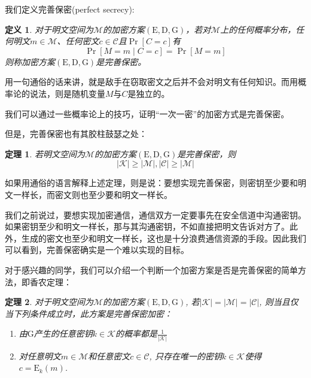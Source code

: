 \documentclass[UTF8]{ctexrep}
\newcommand{\ext}{\displaystyle}
\def\abs#1{\left| #1 \right|}
\def\pth#1{\left( {#1}\right)}
\def\brack#1{\left[ {#1}\right]}
\def\E#1#2{{\mathrm{E}_{#1}\left({#2}\right)}}
\newtheorem{Definition}{\hspace{2em}定义}[chapter]
\newtheorem{theorem}{\hspace{2em}定理}[chapter]
\begin{document}
我们定义完善保密(perfect secrecy):
\begin{Definition}
对于明文空间为$\mathcal{M}$的加密方案$\pth{\mathrm{E}, \mathrm{D}, \mathrm{G}}$，若对$\mathcal{M}$上的任何概率分布，任何明文$m\in\mathcal{M}$、任何密文$c\in\mathcal{C}$且$\Pr\brack{C=c}$有
\begin{equation}
    \Pr\brack{M=m\mid C=c}=\Pr\brack{M=m}
\end{equation}
则称加密方案$\pth{\mathrm{E}, \mathrm{D}, \mathrm{G}}$是完善保密。
\end{Definition}

用一句通俗的话来讲，就是敌手在窃取密文之后并不会对明文有任何知识。而用概率论的说法，则是随机变量$M$与$C$是独立的。\par
我们可以通过一些概率论上的技巧，证明“一次一密”的加密方式是完善保密。\par
但是，完善保密也有其胶柱鼓瑟之处：
\begin{theorem}
若明文空间为$\mathcal{M}$的加密方案$\pth{\mathrm{E}, \mathrm{D}, \mathrm{G}}$是完善保密，则
\begin{equation}
    \abs{\mathcal{K}}\geq\abs{\mathcal{M}}, \abs{\mathcal{C}}\geq\abs{\mathcal{M}}
\end{equation}
\end{theorem}

如果用通俗的语言解释上述定理，则是说：要想实现完善保密，则密钥至少要和明文一样长，而密文则也至少要和明文一样长。\par
我们之前说过，要想实现加密通信，通信双方一定要事先在安全信道中沟通密钥。如果密钥至少和明文一样长，那与其沟通密钥，不如直接把明文告诉对方了。此外，生成的密文也至少和明文一样长，这也是十分浪费通信资源的手段。因此我们可以看到，完善保密确实是一个难以实现的目标。\par
对于感兴趣的同学，我们可以介绍一个判断一个加密方案是否是完善保密的简单方法，即香农定理：
\begin{theorem}
对于明文空间为$\mathcal{M}$的加密方案$\pth{\mathrm{E}, \mathrm{D}, \mathrm{G}}$, 若$\abs{\mathcal{K}} = \abs{\mathcal{M}} = \abs{\mathcal{C}}$, 则当且仅当下列条件成立时，此方案是完善保密加密：
\begin{enumerate}
    \item 由$\mathrm{G}$产生的任意密钥$k\in\mathcal{K}$的概率都是$\ext\frac{1}{\abs{\mathcal{K}}}$
    \item 对任意明文$m\in\mathcal{M}$和任意密文$c\in\mathcal{C}$, 只存在唯一的密钥$k\in\mathcal{K}$使得$c=\E{k}{m}$.
\end{enumerate}
\end{theorem}
\end{document}
